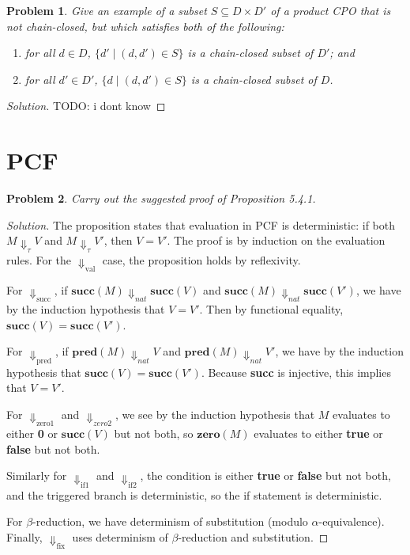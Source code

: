 \documentclass{article}
\newtheorem{problem}{Problem}[section]}
\newcommand{\ev}[1]{\Downarrow_\text{#1}}
\newcommand{\evt}[1]{\Downarrow_\textit{#1}}
\begin{document}
\begin{problem}
    Give an example of a subset $S\subseteq D\times D'$ of a product CPO that is
    not chain-closed, but which satisfies both of the following:
    \begin{enumerate}[label=(\alph*)]
        \item for all $d\in D$, $\{d'\mid (d,d')\in S\}$ is  a chain-closed
            subset of $D'$; and
        \item for all $d'\in D'$, $\{d\mid (d,d')\in S\}$ is  a chain-closed
            subset of $D$.
    \end{enumerate}
\end{problem}
\begin{proof}[Solution]
    TODO: i dont know
\end{proof}

\section{PCF}
\begin{problem}
    Carry out the suggested proof of Proposition 5.4.1.
\end{problem}
\begin{proof}[Solution]
    The proposition states that evaluation in PCF is deterministic: if both
    $M\Downarrow_\tau V$ and $M\Downarrow_\tau V'$, then $V=V'$. The proof is by
    induction on the evaluation rules. For the $\ev{val}$ case, the proposition
    holds by reflexivity.

    For $\ev{succ}$, if $\textbf{succ}(M)\evt{nat} \textbf{succ}(V)$ and
    $\textbf{succ}(M)\evt{nat} \textbf{succ}(V')$, we have by the induction
    hypothesis that $V=V'$. Then by functional equality,
    $\textbf{succ}(V)=\textbf{succ}(V')$.

    For $\ev{pred}$, if $\textbf{pred}(M)\evt{nat}V$ and $\textbf{pred}(M)
    \evt{nat} V'$, we have by the induction hypothesis that $\textbf{succ}(V) =
    \textbf{succ}(V')$. Because \textbf{succ} is injective, this implies that
    $V=V'$.

    For $\ev{zero1}$ and $\evt{zero2}$, we see by the induction hypothesis that
    $M$ evaluates to either \textbf{0} or $\textbf{succ}(V)$ but not both, so
    $\textbf{zero}(M)$ evaluates to either \textbf{true} or \textbf{false} but
    not both.

    Similarly for $\ev{if1}$ and $\ev{if2}$, the condition is either
    \textbf{true} or \textbf{false} but not both, and the triggered branch is
    deterministic, so the if statement is deterministic.

    For $\beta$-reduction, we have determinism of substitution (modulo
    $\alpha$-equivalence). Finally, $\ev{fix}$ uses determinism of
    $\beta$-reduction and substitution.
\end{proof}
\end{document}
